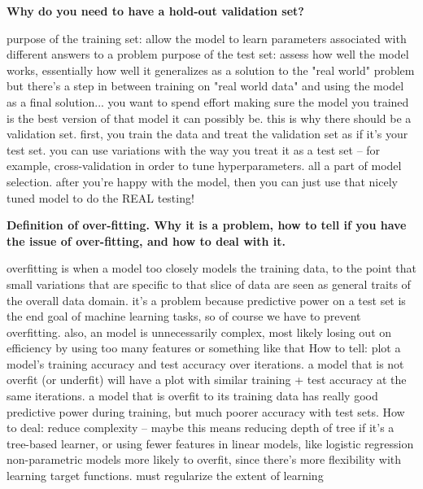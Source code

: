 \documentclass[10pt,letterpaper]{article}
\begin{document}
\subitem \textbf{ Why do you need to have a hold-out validation set?}
\begin{solution}
purpose of the training set: allow the model to learn parameters associated with different answers to a problem \newline
purpose of the test set: assess how well the model works, essentially how well it generalizes as a solution to the "real world" problem \newline \newline 
but there's a step in between training on "real world data" and using the model as a final solution... you want to spend effort making sure the model you trained is the best version of that model it can possibly be. this is why there should be a validation set. \newline
first, you train the data and treat the validation set as if it's your test set. you can use variations with the way you treat it as a test set -- for example, cross-validation in order to tune hyperparameters. all a part of model selection. after you're happy with the model, then you can just use that nicely tuned model to do the REAL testing!
\end{solution}

\subitem \textbf{ Definition of over-fitting. Why it is a problem, how to tell if you have the issue of over-fitting, and how to deal with it.}
\begin{solution}
overfitting is when a model too closely models the training data, to the point that small variations that are specific to that slice of data are seen as general traits of the overall data domain. it's a problem because predictive power on a test set is the end goal of machine learning tasks, so of course we have to prevent overfitting. also, an model is unnecessarily complex, most likely losing out on efficiency by using too many features or something like that
\newline \newline 
How to tell: plot a model's training accuracy and test accuracy over iterations. a model that is not overfit (or underfit) will have a plot with similar training + test accuracy at the same iterations. a model that is overfit to its training data has really good predictive power during training, but much poorer accuracy with test sets.
\newline 
How to deal:
\subitem reduce complexity -- maybe this means reducing depth of tree if it's a tree-based learner, or using fewer features in linear models, like logistic regression \newline 
\subitem non-parametric models more likely to overfit, since there's more flexibility with learning target functions. must regularize the extent of learning
\end{solution}
\end{document}
